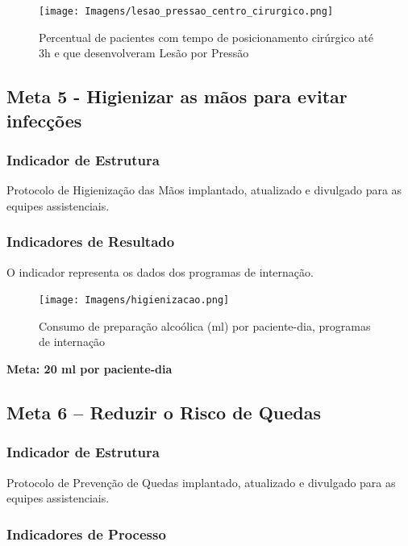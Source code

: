 \documentclass[
  a4paper]{article}
\begin{document}
\begin{figure}[H]
\caption{Percentual de pacientes com tempo de posicionamento cirúrgico até 3h e que desenvolveram Lesão por Pressão}
\texttt{[image: Imagens/lesao\_pressao\_centro\_cirurgico.png]}
\end{figure}

\newpage
\subsection{Meta 5 -  Higienizar as mãos para evitar infecções}

\subsubsection{Indicador de Estrutura}

Protocolo de Higienização das Mãos implantado, atualizado e divulgado
para as equipes assistenciais.

\subsubsection{Indicadores de Resultado}

O indicador representa os dados dos programas de internação.

\begin{figure}[H]
\caption{Consumo de preparação alcoólica (ml) por paciente-dia, programas de internação}
\texttt{[image: Imagens/higienizacao.png]}
\end{figure}

\begin{center}
 \textbf{Meta: 20 ml por paciente-dia}
\end{center}

\subsection{Meta 6 – Reduzir o Risco de Quedas}

\subsubsection{Indicador de Estrutura}

Protocolo de Prevenção de Quedas implantado, atualizado e divulgado para
as equipes assistenciais.

\subsubsection{Indicadores de Processo}
\end{document}
